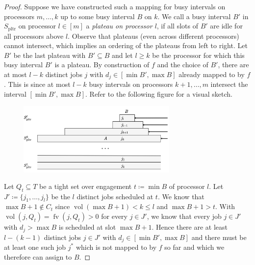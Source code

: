 \documentclass[a4paper]{article}
\DeclareMathOperator{\pltr}{pltr}
\DeclareMathOperator{\fv}{fv}
\DeclareMathOperator{\vol}{vol}
\begin{document}
\begin{proof}
  Suppose we have constructed such a mapping for busy intervals on processors $m, \ldots, k$ up to some busy interval $B$ on $k$.
  We call a busy interval $B'$ in $S_{\pltr}$ on processor $l \in [m]$ a \emph{plateau on processor $l$}, if all slots of $B'$ are idle for all processors above $l$.
  Observe that plateaus (even across different processors) cannot intersect, which implies an ordering of the plateaus from left to right.
  Let $B'$ be the last plateau with $B' \subseteq B$ and let $l \geq k$ be the processor for which this busy interval $B'$ is a plateau.
  By construction of $f$ and the choice of $B'$, there are at most $l - k$ distinct jobs $j$ with $d_j \in [\min B', \max B]$ already mapped to by $f$.
  This is since at most $l - k$ busy intervals on processors $k+1, \ldots, m$ intersect the interval $[\min B', \max B]$.
  Refer to the following figure for a visual sketch.
  \begin{figure}[H]
    \centering
    \includegraphics[width=0.7\textwidth]{graphics/running_time.jpg}
  \end{figure}
  Let $Q_t \subseteq T$ be a tight set over engagement $t \coloneqq \min B$ of processor $l$.
  Let $J' \coloneqq \{ j_1, \ldots, j_{l} \}$ be the $l$ distinct jobs scheduled at $t$.
  We know that $\max B + 1 \notin C_t$ since $\vol(\max B + 1) < k \leq l$ and $\max B + 1 > t$.
  With $\vol(j, Q_t) = \fv(j, Q_t) > 0$ for every $j \in J'$, we know that every job $j \in J'$ with $d_j > \max B$ is scheduled at slot $\max B + 1$.
  Hence there are at least $l - (k-1)$ distinct jobs $j \in J'$ with $d_j \in [\min B', \max B]$ and there must be at least one such job $j^*$ which is not mapped to by $f$ so far and which we therefore can assign to $B$.
\end{proof}

\listoftodos{}
%


\end{document}

